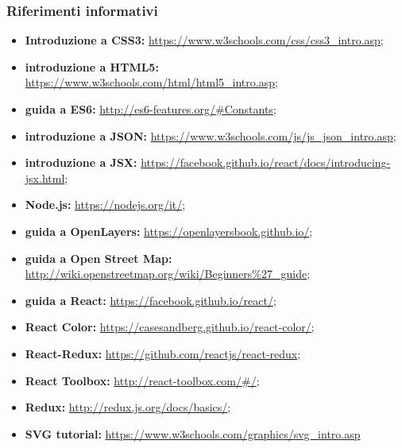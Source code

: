 		\subsubsection{Riferimenti informativi}
		\begin{itemize}
			\item \textbf{Introduzione a CSS3: }
			\href{https://www.w3schools.com/css/css3_intro.asp}{https://www.w3schools.com/css/css3_intro.asp};
			\item \textbf{introduzione a HTML5:}
			\href{https://www.w3schools.com/html/html5_intro.asp}{https://www.w3schools.com/html/html5_intro.asp};
			\item \textbf{guida a ES6:}
			\href{http://es6-features.org/\#Constants}{http://es6-features.org/\#Constants};
			\item \textbf{introduzione a JSON:}
			\href{https://www.w3schools.com/js/js_json_intro.asp}{https://www.w3schools.com/js/js_json_intro.asp};
			\item \textbf{introduzione a JSX:}
			\href{https://facebook.github.io/react/docs/introducing-jsx.html}{https://facebook.github.io/react/docs/introducing-jsx.html};
			\item \textbf{Node.js:}
			\href{https://nodejs.org/it/}{https://nodejs.org/it/};
			\item \textbf{guida a OpenLayers:}
			\href{https://openlayersbook.github.io/}{https://openlayersbook.github.io/};
			\item \textbf{guida a Open Street Map:}
			\href{http://wiki.openstreetmap.org/wiki/Beginners\%27_guide}{http://wiki.openstreetmap.org/wiki/Beginners\%27_guide};
			\item \textbf{guida a React:}
			\href{https://facebook.github.io/react/}{https://facebook.github.io/react/};
			\item \textbf{React Color:}
			\href{https://casesandberg.github.io/react-color/}{https://casesandberg.github.io/react-color/};
			\item \textbf{React-Redux:}
			\href{https://github.com/reactjs/react-redux}{https://github.com/reactjs/react-redux};
			\item \textbf{React Toolbox:}
			\href{http://react-toolbox.com/#/}{http://react-toolbox.com/\#/};
			\item \textbf{Redux:}
			\href{http://redux.js.org/docs/basics/}{http://redux.js.org/docs/basics/};
			\item \textbf{SVG tutorial:}
			\href{https://www.w3schools.com/graphics/svg_intro.asp}{https://www.w3schools.com/graphics/svg_intro.asp}
		\end{itemize}
	
